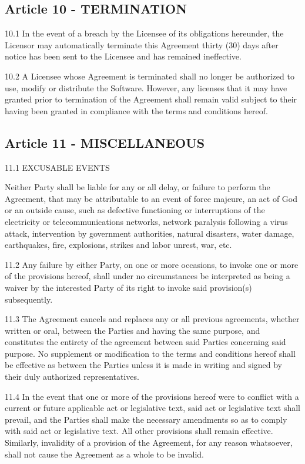 \subsection*{Article 10 - TERMINATION}

10.1 In the event of a breach by the Licensee of its obligations hereunder, the Licensor may automatically terminate this Agreement thirty (30) days after notice has been sent to the Licensee and has remained ineffective.

10.2 A Licensee whose Agreement is terminated shall no longer be authorized to use, modify or distribute the Software. However, any licenses that it may have granted prior to termination of the Agreement shall remain valid subject to their having been granted in compliance with the terms and conditions hereof.

\subsection*{Article 11 - MISCELLANEOUS}

11.1 EXCUSABLE EVENTS

Neither Party shall be liable for any or all delay, or failure to perform the Agreement, that may be attributable to an event of force majeure, an act of God or an outside cause, such as defective functioning or interruptions of the electricity or telecommunications networks, network paralysis following a virus attack, intervention by government authorities, natural disasters, water damage, earthquakes, fire, explosions, strikes and labor unrest, war, etc.

11.2 Any failure by either Party, on one or more occasions, to invoke one or more of the provisions hereof, shall under no circumstances be interpreted as being a waiver by the interested Party of its right to invoke said provision(s) subsequently.

11.3 The Agreement cancels and replaces any or all previous agreements, whether written or oral, between the Parties and having the same purpose, and constitutes the entirety of the agreement between said Parties concerning said purpose. No supplement or modification to the terms and conditions hereof shall be effective as between the Parties unless it is made in writing and signed by their duly authorized representatives.

11.4 In the event that one or more of the provisions hereof were to conflict with a current or future applicable act or legislative text, said act or legislative text shall prevail, and the Parties shall make the necessary amendments so as to comply with said act or legislative text. All other provisions shall remain effective. Similarly, invalidity of a provision of the Agreement, for any reason whatsoever, shall not cause the Agreement as a whole to be invalid.

